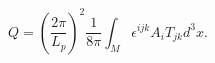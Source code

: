 \begin{equation}
Q=(\frac{2\pi }{L_p})^2\frac 1{8\pi }\int_M\epsilon ^{ijk}A_iT_{jk}d^3x.
\label{intCSform}
\end{equation}

